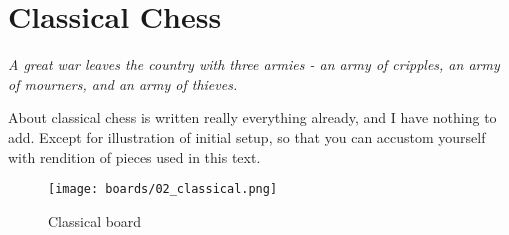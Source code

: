 

\chapter*{Classical Chess}
\label{ch:Classical Chess}

\begin{flushright}
\parbox{0.8\textwidth}{
\emph{A great war leaves the country with three armies -
an army of cripples, an army of mourners, and an army of thieves. \\
 } }
\end{flushright}

\noindent
About classical chess is written really everything already, and I
have nothing to add. Except for illustration of initial setup, so that
you can accustom yourself with rendition of pieces used in this text.

\noindent
\begin{figure}[t]
\texttt{[image: boards/02\_classical.png]}
\caption{Classical board}
\label{fig:02_classical}
\end{figure}

\clearpage %
